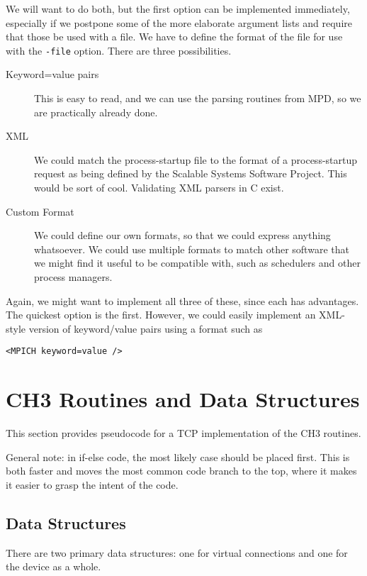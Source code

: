 \documentclass{article}
\def\code{\begingroup\makeustext\eatcode}
\def\eatcode#1{\texttt{#1}\endgroup}
\begin{document}
We will want to do both, but the first option can be implemented
immediately, especially if we postpone some of the more elaborate argument
lists and require that those be used with a file.  We have to define the
format of the file for use with the \code{-file} option.  There are three
possibilities.
\begin{description}
\item[Keyword=value pairs] This is easy to read, and we can use the
  parsing routines from MPD, so we are practically already done.
\item[XML] We could match the process-startup file to the format of a
  process-startup request as being defined by the Scalable Systems Software
  Project.  This would be sort of cool.  Validating XML parsers in C exist.
\item[Custom Format] We could define our own formats, so that we could express
  anything whatsoever.  We could use multiple formats to match other software
  that we might find it useful to be compatible with, such as schedulers and
  other process managers.
\end{description}

Again, we might want to implement all three of these, since each has
advantages.  The quickest option is the first.  However, we could easily
implement an XML-style version of keyword/value pairs using a format such as
\begin{verbatim}
<MPICH keyword=value />
\end{verbatim}



\appendix
\section{CH3 Routines and Data Structures}
\label{app:ch3}

This section provides pseudocode for a TCP implementation of the CH3
routines.

General note: in if-else code, the most likely case should be placed first.
This is both faster and moves the most common code branch to the top, where it
makes it easier to grasp the intent of the code.

\subsection{Data Structures}
There are two primary data structures: one for virtual connections and one for
the device as a whole.
\end{document}
